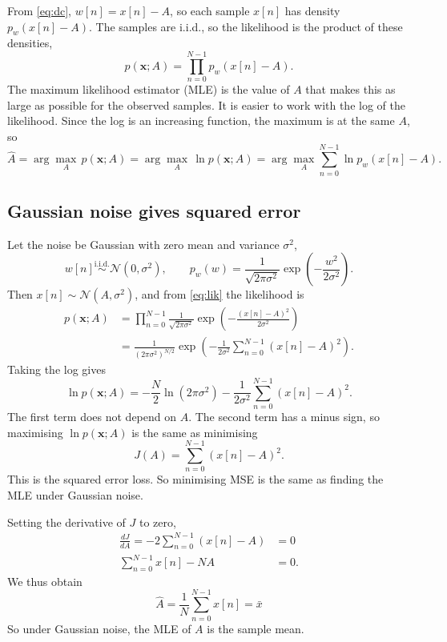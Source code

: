 \documentclass[11pt]{article}
\numberwithin{figure}{section}
\numberwithin{equation}{section}
\begin{document}
From \eqref{eq:dc}, $w[n] = x[n] - A$, so each sample $x[n]$ has density $p_w(x[n]-A)$. The
samples are i.i.d., so the likelihood is the product of these densities,
\begin{equation}
  p(\mathbf{x}; A) = \prod_{n=0}^{N-1} p_w(x[n]-A).
  \label{eq:lik}
\end{equation}
The maximum likelihood estimator (MLE) is the value of $A$ that makes this as large as possible
for the observed samples. It is easier to work with the log of the likelihood. Since the log is an increasing function, the maximum is at the same $A$, so
\[
  \hat A = \arg\max_A \, p(\mathbf{x}; A) = \arg\max_A \, \ln p(\mathbf{x}; A)
  = \arg\max_A \sum_{n=0}^{N-1} \ln p_w(x[n]-A).
\]

\subsection{Gaussian noise gives squared error}

Let the noise be Gaussian with zero mean and variance $\sigma^2$,
\[
  w[n] \overset{\text{i.i.d.}}{\sim} \mathcal{N}(0, \sigma^2), \qquad
  p_w(w) = \frac{1}{\sqrt{2\pi\sigma^2}} \exp\!\left(-\frac{w^2}{2\sigma^2}\right).
\]
Then $x[n] \sim \mathcal{N}(A, \sigma^2)$, and from \eqref{eq:lik} the likelihood is
\begin{align*}
  p(\mathbf{x}; A) &= \prod_{n=0}^{N-1} \frac{1}{\sqrt{2\pi\sigma^2}}
  \exp\!\left(-\frac{(x[n]-A)^2}{2\sigma^2}\right) \\
  &= \frac{1}{(2\pi\sigma^2)^{N/2}}
  \exp\!\left(-\frac{1}{2\sigma^2}\sum_{n=0}^{N-1}(x[n]-A)^2\right).
\end{align*}
Taking the log gives
\[
  \ln p(\mathbf{x}; A) = -\frac{N}{2}\ln(2\pi\sigma^2)
  - \frac{1}{2\sigma^2}\sum_{n=0}^{N-1}(x[n]-A)^2 .
\]
The first term does not depend on $A$. The second term has a minus sign, so maximising
$\ln p(\mathbf{x}; A)$ is the same as minimising
\[
  J(A) = \sum_{n=0}^{N-1}(x[n]-A)^2 .
\]
This is the squared error loss. So minimising MSE is the same as finding the MLE under Gaussian
noise.

Setting the derivative of $J$ to zero,
\begin{align*}
  \frac{dJ}{dA} = -2\sum_{n=0}^{N-1}(x[n]-A) &= 0 \\
  \sum_{n=0}^{N-1} x[n] - NA &= 0 .
\end{align*}
We thus obtain
\[
  \boxed{\hat A = \frac{1}{N}\sum_{n=0}^{N-1} x[n] = \bar{x}}
\]
So under Gaussian noise, the MLE of $A$ is the sample mean.
\end{document}
